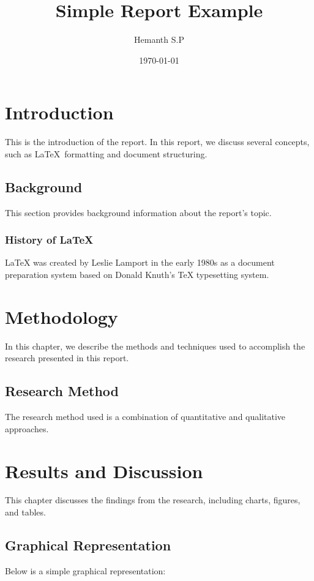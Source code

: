\documentclass[a4paper, 12pt]{report} %
\title{Simple Report Example}
\author{Hemanth S.P} %
\date{\today} %
\begin{document}
\maketitle %

\tableofcontents %

\chapter{Introduction} %
This is the introduction of the report. In this report, we discuss several concepts, such as \LaTeX\ formatting and document structuring.

\section{Background} %
This section provides background information about the report's topic.

\subsection{History of LaTeX} %
LaTeX was created by Leslie Lamport in the early 1980s as a document preparation system based on Donald Knuth's TeX typesetting system.

\chapter{Methodology} %
In this chapter, we describe the methods and techniques used to accomplish the research presented in this report.

\section{Research Method} %
The research method used is a combination of quantitative and qualitative approaches.

\chapter{Results and Discussion} %
This chapter discusses the findings from the research, including charts, figures, and tables.

\section{Graphical Representation} %
Below is a simple graphical representation:
\end{document}
